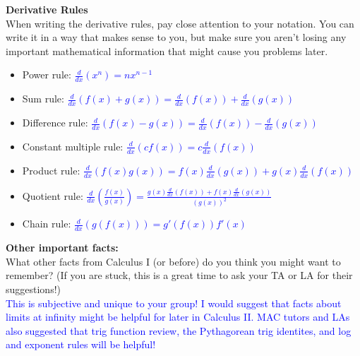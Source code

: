 \documentclass{ximera}
\begin{document}
\begin{exercise}
    \textbf{Derivative Rules} \\
    When writing the derivative rules, pay close attention to your notation.  You can write it in a way that makes sense to you, but make sure you aren't losing any important mathematical information that might cause you problems later.
    \begin{itemize}
        \item Power rule: \textcolor{blue}{$\frac{d}{dx}(x^n)=nx^{n-1}$}
        \item Sum rule: \textcolor{blue}{$\frac{d}{dx}(f(x)+g(x))=\frac{d}{dx}(f(x))+\frac{d}{dx}(g(x))$}
        \item Difference rule: \textcolor{blue}{$\frac{d}{dx}(f(x)-g(x))=\frac{d}{dx}(f(x))-\frac{d}{dx}(g(x))$}
        \item Constant multiple rule: \textcolor{blue}{$\frac{d}{dx}(cf(x))=c\frac{d}{dx}(f(x))$}
        \item Product rule: \textcolor{blue}{$\frac{d}{dx}(f(x)g(x))=f(x)\frac{d}{dx}(g(x))+g(x)\frac{d}{dx}(f(x))$}
        \item Quotient rule: \textcolor{blue}{$\frac{d}{dx}\left(\frac{f(x)}{g(x)}\right)=\frac{g(x)\frac{d}{dx}(f(x))+f(x)\frac{d}{dx}(g(x))}{(g(x))^2}$}
        \item Chain rule: \textcolor{blue}{$\frac{d}{dx}(g(f(x)))=g'(f(x))f'(x)$}
    \end{itemize}
\end{exercise}

\begin{exercise}
    \textbf{Other important facts:}\\
    What other facts from Calculus I (or before) do you think you might want to remember?  (If you are stuck, this is a great time to ask your TA or LA for their suggestions!)\\
    \textcolor{blue}{This is subjective and unique to your group!  I would suggest that facts about limits at infinity might be helpful for later in Calculus II. MAC tutors and LAs also suggested that trig function review, the Pythagorean trig identites, and log and exponent rules will be helpful!} 
\end{exercise}
\end{document}
